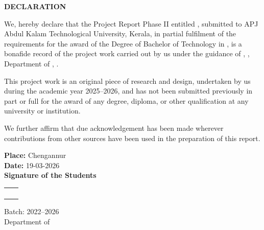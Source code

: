 \begin{center}
	\Large\textbf{DECLARATION}
\end{center}

We, hereby declare that the Project Report Phase II entitled \textbf{\thetitle}, submitted to APJ Abdul Kalam Technological University, Kerala, in partial fulfilment of the requirements for the award of the Degree of Bachelor of Technology in \thedepartment, is a bonafide record of the project work carried out by us under the guidance of \theprojectguide, \projectguidedesignation, Department of \thedepartment, \thecollege.

This project work is an original piece of research and design, undertaken by us during the academic year 2025--2026, and has not been submitted previously in part or full for the award of any degree, diploma, or other qualification at any university or institution.

We further affirm that due acknowledgement has been made wherever contributions from other sources have been used in the preparation of this report.

\vspace{1cm}

\textbf{Place:} Chengannur\\
\textbf{Date:} 19-03-2026\\

\textbf{Signature of the Students}\\

\begin{tabular}{p{6cm} p{4cm}}
	\textbf{\studentA} & \regA \\
	\textbf{\studentB} & \regB \\
	\textbf{\studentC} & \regC \\
	\textbf{\studentD} & \regD \\
	
\end{tabular}
\vspace{1cm}

Batch: 2022--2026\\
Department of \thedepartment\\
\thecollege
